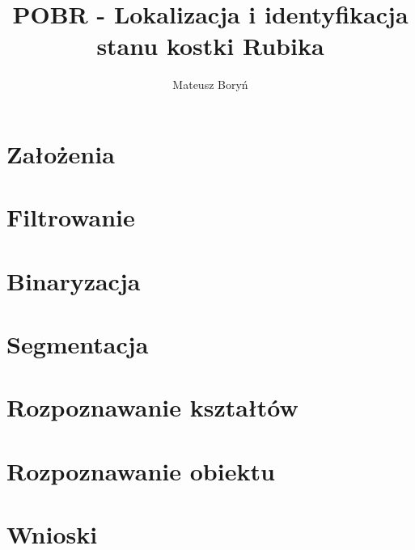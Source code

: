 \documentclass[12pt,a4paper]{article}
\author{Mateusz Boryń}
\title{POBR - Lokalizacja i identyfikacja stanu kostki Rubika}
\begin{document}
\maketitle

\tableofcontents

\section{Założenia}

\section{Filtrowanie}

\section{Binaryzacja}

\section{Segmentacja}

\section{Rozpoznawanie kształtów}

\section{Rozpoznawanie obiektu}

\section{Wnioski}
\end{document}
